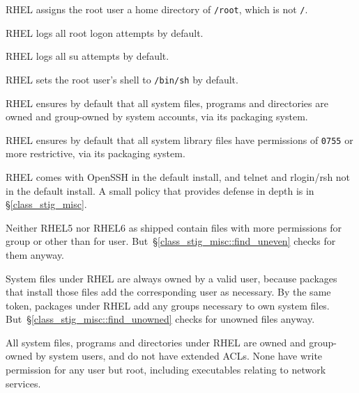  RHEL assigns the root user a home directory
of \verb!/root!, which is not \verb!/!.

 RHEL logs all root logon attempts by
default.

 RHEL logs all su attempts by default.

 RHEL sets the root user's shell to
\verb!/bin/sh! by default.

  RHEL ensures
by default that all system files, programs and directories are owned and
group-owned by system accounts, via its packaging system.

 RHEL ensures by default that all system
library files have permissions of \verb!0755! or more restrictive, via its
packaging system.

 RHEL comes with OpenSSH in the default
install, and telnet and rlogin/rsh not in the default install. A small
policy that provides defense in depth is in \S\ref{class_stig_misc}.

 Neither RHEL5 nor RHEL6 as
shipped contain files with more permissions for group or other than for
user. But~\S\ref{class_stig_misc::find_uneven} checks for them anyway.

System files under RHEL are always owned by a valid user, because packages
that install those files add the corresponding user as necessary. By the
same token, packages under RHEL add any groups necessary to own system
files. But~\S\ref{class_stig_misc::find_unowned} checks for unowned files
anyway.

All system files, programs and directories under RHEL are owned and
group-owned by system users, and do not have extended ACLs. None have
write permission for any user but root, including executables relating to
network services.

